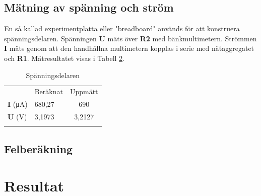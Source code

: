 \documentclass[11pt,a4paper]{article}
\begin{document}
\subsection{Mätning av spänning och ström}\label{meas_multi}
En så kallad experimentplatta eller "breadboard" används för att konstruera
spänningsdelaren. Spänningen \textbf{U} mäts över \textbf{R2} med
bänkmultimetern. Strömmen \textbf{I} mäts genom att den handhållna multimetern
kopplas i serie med nätaggregatet och \textbf{R1}. Mätresultatet visas i
Tabell \ref{vdivtable}.

\begin{table}
    \begin{longtable}[c]{@{}llc@{}}
        \toprule\addlinespace
                              & Beräknat & Uppmätt
        \\\addlinespace
        \midrule\endhead
        \textbf{I} (\si{\uA}) & 680,27   & 690
        \\\addlinespace
        \textbf{U} (\si{\V})  & 3,1973   & 3,2127
        \\\addlinespace
        \bottomrule
        \addlinespace
        \caption{Spänningsdelaren}
        \label{vdivtable}
    \end{longtable}
\end{table}


\subsection{Felberäkning}\label{error}


\section{Resultat}\label{setup}

\newpage

\end{document}
